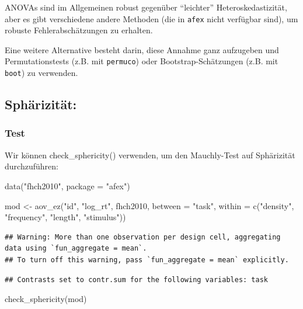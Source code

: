 \documentclass[
]{book}
\newenvironment{Shaded}{\begin{snugshade}}{\end{snugshade}}
\newcommand{\AttributeTok}[1]{\textcolor[rgb]{0.77,0.63,0.00}{#1}}
\newcommand{\FunctionTok}[1]{\textcolor[rgb]{0.00,0.00,0.00}{#1}}
\newcommand{\NormalTok}[1]{#1}
\newcommand{\OtherTok}[1]{\textcolor[rgb]{0.56,0.35,0.01}{#1}}
\newcommand{\StringTok}[1]{\textcolor[rgb]{0.31,0.60,0.02}{#1}}
\begin{document}
ANOVAs sind im Allgemeinen robust gegenüber ``leichter'' Heteroskedastizität, aber es gibt verschiedene andere Methoden (die in \texttt{afex} nicht verfügbar sind), um robuste Fehlerabschätzungen zu erhalten.

Eine weitere Alternative besteht darin, diese Annahme ganz aufzugeben und Permutationstests (z.B. mit \texttt{permuco}) oder Bootstrap-Schätzungen (z.B. mit \texttt{boot}) zu verwenden.

\hypertarget{sphuxe4rizituxe4t}{%
\subsection{Sphärizität:}\label{sphuxe4rizituxe4t}}

\hypertarget{test-1}{%
\subsubsection{Test}\label{test-1}}

Wir können check\_sphericity() verwenden, um den Mauchly-Test auf Sphärizität durchzuführen:

\begin{Shaded}
\begin{Highlighting}[]
\FunctionTok{data}\NormalTok{(}\StringTok{"fhch2010"}\NormalTok{, }\AttributeTok{package =} \StringTok{"afex"}\NormalTok{)}

\NormalTok{mod }\OtherTok{\textless{}{-}} \FunctionTok{aov\_ez}\NormalTok{(}\StringTok{"id"}\NormalTok{, }\StringTok{"log\_rt"}\NormalTok{, fhch2010,}
             \AttributeTok{between =} \StringTok{"task"}\NormalTok{, }
             \AttributeTok{within =} \FunctionTok{c}\NormalTok{(}\StringTok{"density"}\NormalTok{, }\StringTok{"frequency"}\NormalTok{, }\StringTok{"length"}\NormalTok{, }\StringTok{"stimulus"}\NormalTok{))}
\end{Highlighting}
\end{Shaded}

\begin{verbatim}
## Warning: More than one observation per design cell, aggregating data using `fun_aggregate = mean`.
## To turn off this warning, pass `fun_aggregate = mean` explicitly.
\end{verbatim}

\begin{verbatim}
## Contrasts set to contr.sum for the following variables: task
\end{verbatim}

\begin{Shaded}
\begin{Highlighting}[]
\FunctionTok{check\_sphericity}\NormalTok{(mod)}
\end{Highlighting}
\end{Shaded}
\end{document}
